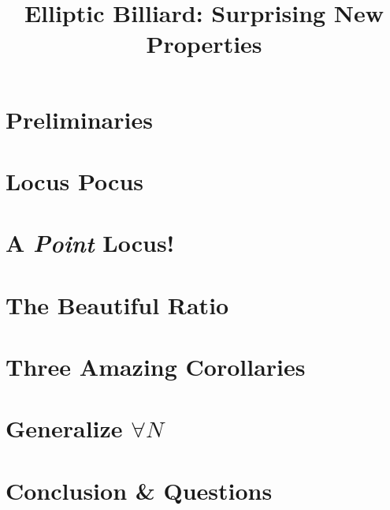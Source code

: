 \documentclass[aspectratio=169]{beamer}
\title{Elliptic Billiard: Surprising New Properties}
\author[Reznik, Garcia, Koiller]{}
\institute[]{\texttt{[image: pics/0000\_billiard\_rack.png]}
\\[10pt] D. Reznik -- Upper West Soluções \and
R. Garcia -- Univ. Federal de Goiás \and 
J. Koiller -- Univ. Federal de Juiz de Fora}
\date{}
\begin{document}
\frame{\titlepage}
    

\section{Preliminaries}
\frame{\sectionpage}


%

\section{Locus Pocus}
\frame{\sectionpage}


\section{A {\em Point} Locus!}
\frame{\sectionpage}


%

\section{The Beautiful Ratio}
\frame{\sectionpage}


\section{Three Amazing Corollaries}
\frame{\sectionpage}


\section{Generalize $\forall{N}$}
\frame{\sectionpage}


\section{Conclusion \& Questions}

\end{document}
